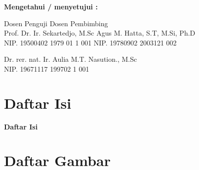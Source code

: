 \documentclass[12pt]{article}
\begin{document}
	\vspace{20pt}
	
	\begin{center}
		\textbf{Mengetahui / menyetujui :}
	\end{center}

	
	\begin{center}
		Dosen Penguji \hspace{150pt} Dosen Pembimbing \\
		Prof. Dr. Ir. Sekartedjo, M.Sc \hspace{75pt} Agus M. Hatta, S.T, M.Si, Ph.D \\
		NIP. 19500402 1979 01 1 001 \hspace{85pt} NIP. 19780902 2003121 002 \\
	\end{center}

	\vspace{75pt}	
	
	\begin{flushleft}
		Dr. rer. nat. Ir. Aulia M.T. Nasution., M.Sc \\
		NIP. 19671117 199702 1 001
	\end{flushleft}


\newpage
\thispagestyle{plain}
\mbox{}


\newpage

 	\section{Daftar Isi}

	\begin{center}
		\textbf{{\large Daftar Isi}}
	\end{center}
	
	\tableofcontents




\newpage

	\section{Daftar Gambar}
\end{document}
